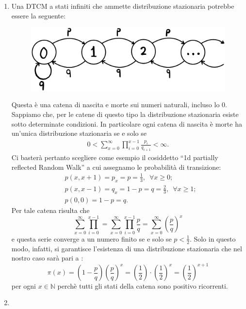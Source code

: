\documentclass[12pt]{homework}
\begin{document}
\begin{enumerate}
  \newpage
  \item
  Una DTCM a stati infiniti che ammette distribuzione stazionaria potrebbe essere la seguente:
  
  \begin{figure}[htb]\centering
\includegraphics[scale=0.1]{Catena5.1}
  \end{figure}
  
  Questa è una catena di nascita e morte sui numeri naturali, incluso lo 0. Sappiamo che, per le catene di questo tipo la distribuzione stazionaria esiste sotto determinate condizioni. In particolare ogni catena di nascita è morte ha un'unica distribuzione stazionaria se e solo se 
  \begin{align*}
  0 <  \sum_{x=0}^{\infty}\prod_{i=0}^{x-1}\frac{p_i}{q_{i+1}} < \infty.
\end{align*}  
Ci basterà pertanto scegliere come esempio il cosiddetto ``1d partially reflected Random Walk'' a cui assegnamo le probabilità di transizione:
\begin{align*}
&p\left(x,x+1\right)=p_{x}=p = \frac{1}{3}, \,\,\, \forall x\geq0; \\
&p\left(x,x-1\right)=q_{x}=1-p= q = \frac{2}{3}, \,\,\, \forall x \geq 1; \\ 
&p\left(0,0\right)=1-p=q.
\end{align*}  
Per tale catena risulta che
\begin{equation*}
\sum_{x=0}^{\infty}\prod_{i=0}^{x-1}=\sum_{x=0}^{\infty}\prod_{i=0}^{x-1}\frac{p}{q}=\sum_{x=0}^{\infty}\left(\frac{p}{q}\right)^{x}
\end{equation*}
e questa serie converge a un numero finito se e solo se $p < \frac{1}{2}$. Solo in questo modo, infatti, si garantisce l'esistenza di una distribuzione stazionaria che nel nostro caso sarà pari a :
\begin{equation*}
\pi\left(x\right)=\left(1-\frac{p}{q}\right)\left(\frac{p}{q}\right)^{x} = \left(\frac{1}{2}\right)\cdot\left(\frac{1}{2}\right)^{x}=\left(\frac{1}{2}\right)^{x+1}
\end{equation*}
per ogni $x \in \mathbb{N}$ perchè tutti gli stati della catena sono positivo ricorrenti. 
\newpage
\item


\end{enumerate}
\end{document}
